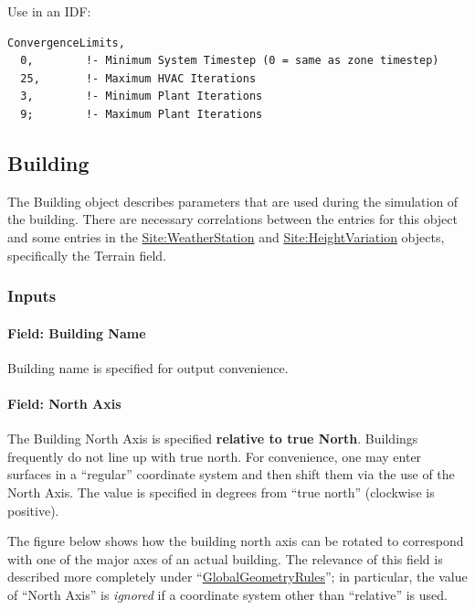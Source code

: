 Use in an IDF:

\begin{lstlisting}
ConvergenceLimits,
  0,        !- Minimum System Timestep (0 = same as zone timestep)
  25,       !- Maximum HVAC Iterations
  3,        !- Minimum Plant Iterations
  9;        !- Maximum Plant Iterations
\end{lstlisting}

\subsection{Building}\label{building}

The Building object describes parameters that are used during the simulation of the building. There are necessary correlations between the entries for this object and some entries in the \hyperref[siteweatherstation]{Site:WeatherStation} and \hyperref[siteheightvariation]{Site:HeightVariation} objects, specifically the Terrain field.

\subsubsection{Inputs}\label{inputs-3-034}

\paragraph{Field: Building Name}\label{field-building-name}

Building name is specified for output convenience.

\paragraph{Field: North Axis}\label{field-north-axis}

The Building North Axis is specified \textbf{relative to true North}. Buildings frequently do not line up with true north. For convenience, one may enter surfaces in a ``regular'' coordinate system and then shift them via the use of the North Axis. The value is specified in degrees from ``true north'' (clockwise is positive).

The figure below shows how the building north axis can be rotated to correspond with one of the major axes of an actual building. The relevance of this field is described more completely under ``\hyperref[globalgeometryrules]{GlobalGeometryRules}''; in particular, the value of ``North Axis'' is \emph{ignored} if a coordinate system other than ``relative'' is used.

